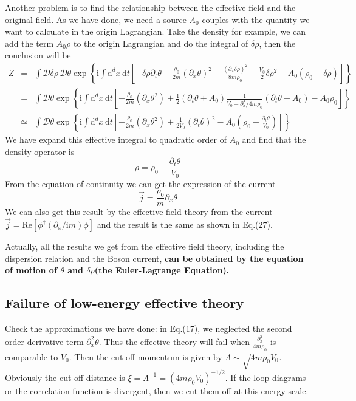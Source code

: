 \documentclass{article}
\newcommand{\im}{\mathrm{i}}
\newcommand{\ud}{\mathrm{d}}
\begin{document}
Another problem is to find the relationship between the effective field and the original field. As we have done, we need a source $A_0$ couples with the quantity we want to calculate in the origin Lagrangian. Take the density for example, we can add the term $A_0 \rho$ to the origin Lagrangian and do the integral of $\delta \rho$, then the conclusion will be
\begin{eqnarray}
Z &=& \int \mathcal{D}\delta\rho\,\mathcal{D}\theta \exp{\left\{\im \int  \ud^dx\, \ud t \left[-\delta \rho\partial_t \theta -\frac{\rho_0}{2m}(\partial_x \theta)^2 -\frac{(\partial_x \delta \rho)^2}{8m\rho_0} -\frac{V_0}{2}\delta \rho^2 - A_0 (\rho_0 + \delta \rho) \right]\right\}}\nonumber\\
&=&  \int \mathcal{D}\theta \exp{\left\{\im \int \ud^dx\,\ud t \left[-\frac{\rho_0}{2m}(\partial_x \theta^2 )+ \frac{1}{2}(\partial_t \theta + A_0) \frac{1}{V_0 - \partial_x^2/4m\rho_0}(\partial_t \theta+A_0)-A_0\rho_0\right]\right\}}\nonumber\\
&\simeq& \int \mathcal{D}\theta \exp{\left\{\im \int \ud^dx\,\ud t  \left[-\frac{\rho_0}{2m}(\partial_x \theta^2 )+ \frac{1}{2V_0}(\partial_t \theta)^2 - A_0\left(\rho_0-\frac{\partial_t \theta}{V_0}\right)\right]\right\}}
\end{eqnarray}
We have expand this effective integral to quadratic order of $A_0$ and find that the density operator is
\begin{equation}
\rho = \rho_0-\frac{\partial_t \theta}{V_0}
\end{equation}
From the equation of continuity we can get the expression of the current
\begin{equation}
\vec{j} = \frac{\rho_0}{m}\partial_x\theta
\end{equation}
We can also get this result by the effective field theory from the current $\vec{j} = \mathrm{Re}[\phi^\dagger (\partial_x/\im m)\phi]$ and the result is the same as shown in Eq.(27).

Actually, all the results we get from the effective field theory, including the dispersion relation and the Boson current, {\bf{can be obtained by the equation of motion of $\theta$ and $\delta \rho$(the Euler-Lagrange Equation). }}
\subsection{Failure of low-energy effective theory}
Check the approximations we have done: in Eq.(17), we neglected the second order derivative term $\partial_x^2 \theta$. Thus the effective theory will fail when $\frac{\partial_x^2}{4m\rho_0}$ is comparable to $V_0$. Then the cut-off momentum is given by $\Lambda\sim\sqrt{4m\rho_0V_0}$. Obviously the cut-off distance is $\xi = \Lambda^{-1}=(4m\rho_0V_0)^{-1/2}$. If the loop diagrams or the correlation function is divergent, then we cut them off at this energy scale.
\end{document}
